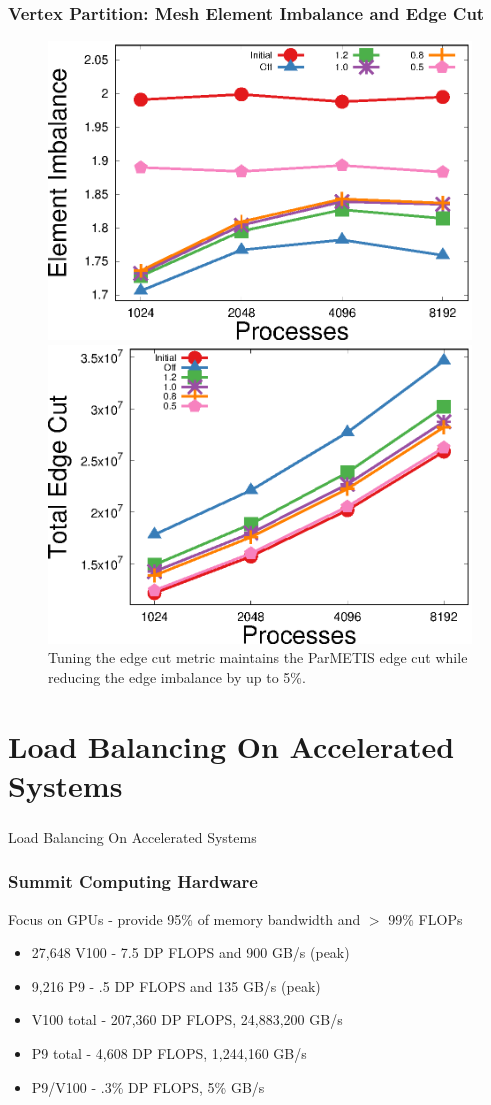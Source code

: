 \documentclass[aspectratio=169]{beamer}
\begin{document}
\begin{frame}
  \frametitle{Vertex Partition: Mesh Element Imbalance and Edge Cut}
  \begin{figure}
    \centering
    \includegraphics[width=.48\textwidth]{../accelerated_cse19/figures/eimb_v_cores.eps}
    \includegraphics[width=.48\textwidth]{../accelerated_cse19/figures/ecut_v_cores.eps}\\
    Tuning the edge cut metric maintains the ParMETIS edge cut while reducing the
    edge imbalance by up to 5\%.
  \end{figure}  
\end{frame}

\section{Load Balancing On Accelerated Systems}

\begin{frame}
  \frametitle{}
  \center \huge{Load Balancing On Accelerated Systems}
\end{frame}

\begin{frame}
  \frametitle{Summit Computing Hardware}
  Focus on GPUs - provide 95\% of memory bandwidth and $>$ 99\% FLOPs
  \begin{itemize}
    \item 27,648 V100 - 7.5 DP FLOPS and 900 GB/s (peak)
    \item 9,216 P9 - .5 DP FLOPS and 135 GB/s (peak)
    \item V100 total - 207,360 DP FLOPS, 24,883,200 GB/s
    \item P9 total - 4,608 DP FLOPS, 1,244,160 GB/s
    \item P9/V100 - .3\% DP FLOPS, 5\% GB/s
  \end{itemize}
\end{frame}
\end{document}
